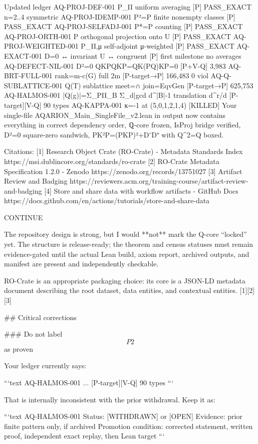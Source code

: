 Updated ledger
AQ-PROJ-DEF-001 P_Π uniform averaging [P] PASS_EXACT n=2..4 symmetric
AQ-PROJ-IDEMP-001 P²=P finite nonempty classes [P] PASS_EXACT
AQ-PROJ-SELFADJ-001 P*=P counting [P] PASS_EXACT
AQ-PROJ-ORTH-001 P orthogonal projection onto U [P] PASS_EXACT
AQ-PROJ-WEIGHTED-001 P_{Π,μ} self-adjoint μ-weighted [P] PASS_EXACT
AQ-EXACT-001 D=0 ↔ invariant U ↔ congruent [P] first milestone no averages
AQ-DEFECT-NIL-001 D²=0 QKPQKP=QK(PQ)KP=0 [P+V-Q] 3,983
AQ-BRT-FULL-001 rank=m-c(G) full 2m [P-target→P] 166,483 0 viol
AQ-Q-SUBLATTICE-001 Q(T) sublattice meet=∩ join=EqvGen [P-target→P] 625,753
AQ-HALMOS-001 |Q(g)|=Σ_PΠ_B Σ_{d|gcd} d^{|B|-1} translation d^r/d [P-target][V-Q] 90 types
AQ-KAPPA-001 κ=-1 at (5,0,1,2,1,4) [KILLED]
Your single-file AQARION_Main_SingleFile_v2.lean in output now contains everything in correct dependency order, ℚ-core frozen, IsProj bridge verified, D²=0 square-zero sandwich, PK²P=(PKP)²+D⁻D⁺ with Q^{2}=Q boxed.

Citations:
[1] Research Object Crate (RO-Crate) - Metadata Standards Index https://msi.dublincore.org/standards/ro-crate
[2] RO-Crate Metadata Specification 1.2.0 - Zenodo https://zenodo.org/records/13751027
[3] Artifact Review and Badging https://reviewers.acm.org/training-course/artifact-review-and-badging
[4] Store and share data with workflow artifacts - GitHub Docs https://docs.github.com/en/actions/tutorials/store-and-share-data

CONTINUE 🤔

The repository design is strong, but I would **not** mark the Q-core “locked” yet. The structure is release-ready; the theorem and census statuses must remain evidence-gated until the actual Lean build, axiom report, archived outputs, and manifest are present and independently checkable.

RO-Crate is an appropriate packaging choice: its core is a JSON-LD metadata document describing the root dataset, data entities, and contextual entities. [1][2][3]

## Critical corrections

### Do not label $$P2$$ as proven

Your ledger currently says:

```text
AQ-HALMOS-001 ... [P-target][V-Q] 90 types
```

That is internally inconsistent with the prior withdrawal. Keep it as:

```text
AQ-HALMOS-001
Status: [WITHDRAWN] or [OPEN]
Evidence: prior finite pattern only, if archived
Promotion condition: corrected statement, written proof,
independent exact replay, then Lean target
```

